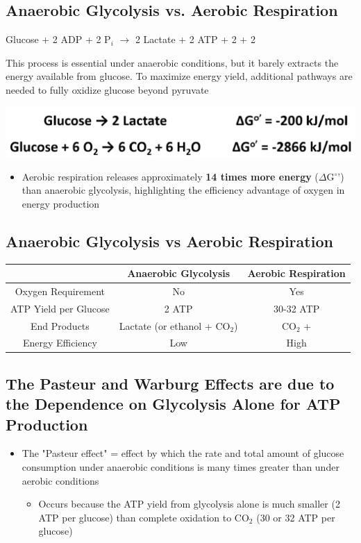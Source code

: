 \documentclass[10pt]{article}
\newcommand{\water}{\text{H$_2$O}}
\newcommand{\proton}{\text{H$^+$}}
\begin{document}
\subsection*{Anaerobic Glycolysis vs. Aerobic Respiration}
\begin{center} 
	Glucose + 2 ADP + 2 P$_i$ $\rightarrow$ 2 Lactate + 2 ATP + 2 \water + 2 \proton
\end{center}
This process is essential under anaerobic conditions, but it barely extracts the energy available from glucose.  To maximize energy yield, additional pathways are needed to fully oxidize glucose beyond pyruvate
\begin{center} 
	\includegraphics*[width=\textwidth]{L2_17.png}
\end{center}
\begin{itemize}
	\item Aerobic respiration releases approximately \textbf{14 times more energy} ($\Delta$G$^\circ$') than anaerobic glycolysis, highlighting the efficiency advantage of oxygen in energy production
\end{itemize}

\subsection*{Anaerobic Glycolysis vs Aerobic Respiration}
\begin{center}
    \begin{tabular}{|c|c|c|}
    \hline
    & \textbf{Anaerobic Glycolysis} & \textbf{Aerobic Respiration}\\
    \hline
    Oxygen Requirement & No & Yes \\
    \hline
    ATP Yield per Glucose & 2 ATP & 30-32 ATP \\
    \hline
    End Products & Lactate (or ethanol + CO$_2$) & CO$_2$ + \water \\
    \hline
    Energy Efficiency & Low & High \\
    \hline
    \end{tabular}
\end{center}

\subsection*{The Pasteur and Warburg Effects are due to the Dependence on Glycolysis Alone for ATP Production}
\begin{itemize}
	\item The "Pasteur effect" = effect by which the rate and total amount of glucose consumption under anaerobic conditions is many times greater than under aerobic conditions
	\begin{itemize}
        \item Occurs because the ATP yield from glycolysis alone is much smaller (2 ATP per glucose) than complete oxidation to CO$_2$ (30 or 32 ATP per glucose)
    \end{itemize}
\end{itemize}
\end{document}

